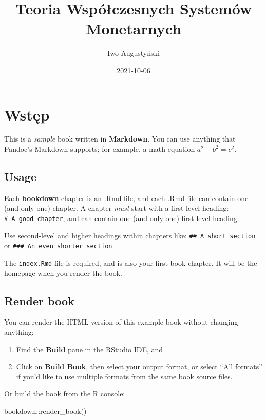\documentclass[
]{book}
\title{Teoria Współczesnych Systemów Monetarnych}
\author{Iwo Augustyński}
\date{2021-10-06}
\newenvironment{Shaded}{\begin{snugshade}}{\end{snugshade}}
\newcommand{\FunctionTok}[1]{\textcolor[rgb]{0.00,0.00,0.00}{#1}}
\newcommand{\NormalTok}[1]{#1}
\newcommand{\SpecialCharTok}[1]{\textcolor[rgb]{0.00,0.00,0.00}{#1}}
\begin{document}
\maketitle

{
\setcounter{tocdepth}{1}
\tableofcontents
}
\hypertarget{wstux119p}{%
\chapter{Wstęp}\label{wstux119p}}

This is a \emph{sample} book written in \textbf{Markdown}. You can use anything that Pandoc's Markdown supports; for example, a math equation \(a^2 + b^2 = c^2\).

\hypertarget{usage}{%
\section{Usage}\label{usage}}

Each \textbf{bookdown} chapter is an .Rmd file, and each .Rmd file can contain one (and only one) chapter. A chapter \emph{must} start with a first-level heading: \texttt{\#\ A\ good\ chapter}, and can contain one (and only one) first-level heading.

Use second-level and higher headings within chapters like: \texttt{\#\#\ A\ short\ section} or \texttt{\#\#\#\ An\ even\ shorter\ section}.

The \texttt{index.Rmd} file is required, and is also your first book chapter. It will be the homepage when you render the book.

\hypertarget{render-book}{%
\section{Render book}\label{render-book}}

You can render the HTML version of this example book without changing anything:

\begin{enumerate}
\def\labelenumi{\arabic{enumi}.}
\item
  Find the \textbf{Build} pane in the RStudio IDE, and
\item
  Click on \textbf{Build Book}, then select your output format, or select ``All formats'' if you'd like to use multiple formats from the same book source files.
\end{enumerate}

Or build the book from the R console:

\begin{Shaded}
\begin{Highlighting}[]
\NormalTok{bookdown}\SpecialCharTok{::}\FunctionTok{render\_book}\NormalTok{()}
\end{Highlighting}
\end{Shaded}
\end{document}
